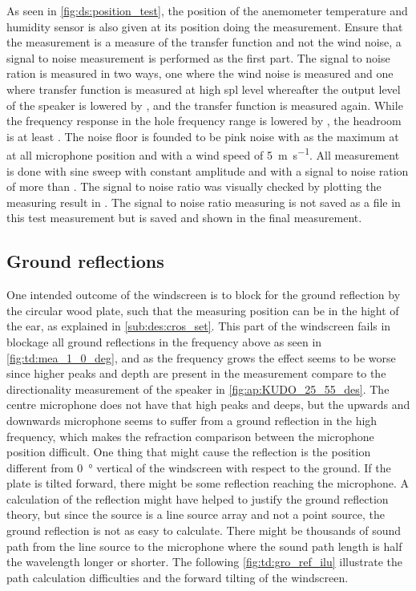 
As seen in \autoref{fig:ds:position_test}, the position of the anemometer temperature and humidity sensor is also given at its position doing the measurement. Ensure that the measurement is a measure of the transfer function and not the wind noise, a signal to noise measurement is performed as the first part. The signal to noise ration is measured in two ways, one where the wind noise is measured and one where transfer function is measured at high \gls{spl} level whereafter the output level of the speaker is lowered by , and the transfer function is measured again. While the frequency response in the hole frequency range is lowered by , the headroom is at least  . The noise floor is founded to be pink noise with  as the maximum at  at all microphone position and with a wind speed of \SI{5}{\meter\per\second}. All measurement is done with sine sweep with constant amplitude and with a signal to noise ration of more than . The signal to noise ratio was visually checked by plotting the measuring result in \matlab. The signal to noise ratio measuring is not saved as a file in this test measurement but is saved and shown in the final measurement.



\subsection{Ground reflections}\label{sec:des:ground_reflection}
One intended outcome of the windscreen is to block for the ground reflection by the circular wood plate, such that the measuring position can be in the hight of the ear, as explained in \autoref{sub:des:cros_set}. This part of the windscreen fails in blockage all ground reflections in the frequency above  as seen in \autoref{fig:td:mea_1_0_deg}, and as the frequency grows the effect seems to be worse since higher peaks and depth are present in the measurement compare to the directionality measurement of the speaker in \autoref{fig:ap:KUDO_25_55_des}. The centre microphone does not have that high peaks and deeps, but the upwards and downwards microphone seems to suffer from a ground reflection in the high frequency, which makes the refraction comparison between the microphone position difficult. One thing that might cause the reflection is the position different from \SI{0}{\degree} vertical of the windscreen with respect to the ground. If the plate is tilted forward, there might be some reflection reaching the microphone. A calculation of the reflection might have helped to justify the ground reflection theory, but since the source is a line source array and not a point source, the ground reflection is not as easy to calculate. There might be thousands of sound path from the line source to the microphone where the sound path length is half the wavelength longer or shorter. The following \autoref{fig:td:gro_ref_ilu} illustrate the path calculation difficulties and the forward tilting of the windscreen. 

